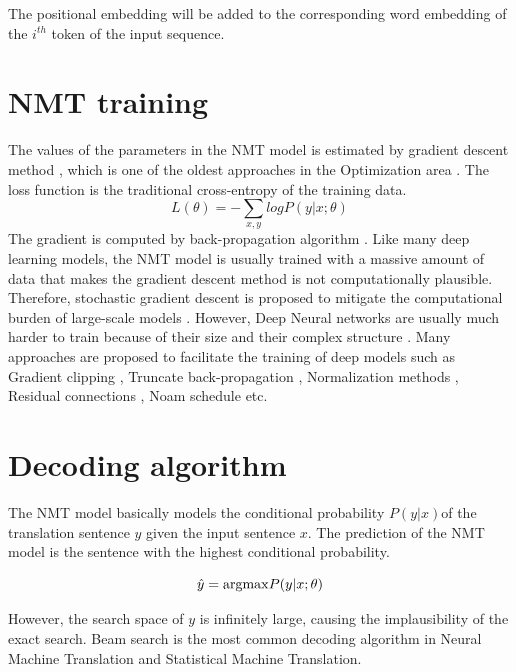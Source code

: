 The positional embedding will be added to the corresponding word embedding of the $i^{th}$ token of the input sequence.
\section{NMT training} \label{sec:train}
The values of the parameters in the NMT model is estimated by gradient descent method \citep{Nesterov14introductory}, which is one of the oldest approaches in the Optimization area \citep{Cauchy1847method}. The loss function is the traditional cross-entropy of the training data. 
\begin{equation}
L(\theta) = -\displaystyle{\mathop{\sum}_{x,y}}log P(y|x;\theta)
\end{equation}
The gradient is computed by back-propagation algorithm \citep{Rumelhart88learning}. Like many deep learning models, the NMT model is usually trained with a massive amount of data that makes the gradient descent method is not computationally plausible. Therefore, stochastic gradient descent is proposed to mitigate the computational burden of large-scale models \citep{Herbert51stochastic,Kiefer52stochastic,Bottou10large}. However, Deep Neural networks are usually much harder to train because of their size and their complex structure \cite{Pascanu13onthe,Glorot10understanding}. Many approaches are proposed to facilitate the training of deep models such as Gradient clipping \citep{Pascanu13onthe}, Truncate back-propagation \citep{Jaeger02tutorial}, Normalization methods \citep{Ioffe15batch,Jimmy16layer}, Residual connections \citep{He16deep}, Noam schedule \citep{Vaswani17attention} etc.

\section{Decoding algorithm} \label{sec:inference}
The NMT model basically models the conditional probability $P(y|x)$of the translation sentence $y$ given the input sentence $x$. The prediction of the NMT model is the sentence with the highest conditional probability.

\begin{equation}
\hat{y} = \displaystyle{\mathop{\operatorname*{argmax}}} P(y|x;\theta)
\end{equation}

However, the search space of $y$ is infinitely large, causing the implausibility of the exact search. Beam search \citep{Och98improving} is the most common decoding algorithm in Neural Machine Translation and Statistical Machine Translation. 

